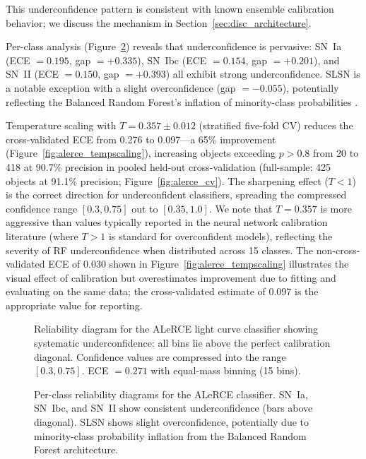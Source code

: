 \documentclass[twocolumn]{aastex631}
\begin{document}
This underconfidence pattern is consistent with known ensemble
calibration behavior; we discuss the mechanism in
Section~\ref{sec:disc_architecture}.

Per-class analysis (Figure~\ref{fig:alerce_perclass}) reveals that underconfidence is pervasive: SN~Ia (ECE $= 0.195$, gap $= +0.335$), SN~Ibc (ECE $= 0.154$, gap $= +0.201$), and SN~II (ECE $= 0.150$, gap $= +0.393$) all exhibit strong underconfidence. SLSN is a notable exception with a slight overconfidence (gap $= -0.055$), potentially reflecting the Balanced Random Forest's inflation of minority-class probabilities \citep{vandengoorbergh2022}.

Temperature scaling with $T = 0.357 \pm 0.012$ (stratified five-fold CV) reduces the cross-validated ECE from 0.276 to 0.097---a 65\% improvement (Figure~\ref{fig:alerce_tempscaling}),
increasing objects exceeding $p > 0.8$ from 20 to 418 at 90.7\% precision in pooled held-out cross-validation (full-sample: 425 objects at 91.1\% precision; Figure~\ref{fig:alerce_cv}).
The sharpening effect ($T < 1$) is the correct direction for underconfident classifiers, spreading the compressed confidence range $[0.3, 0.75]$ out to $[0.35, 1.0]$. We note that $T = 0.357$ is more aggressive than values typically reported in the neural network calibration literature (where $T > 1$ is standard for overconfident models), reflecting the severity of RF underconfidence when distributed across 15 classes. The non-cross-validated ECE of 0.030 shown in Figure~\ref{fig:alerce_tempscaling} illustrates the visual effect of calibration but overestimates improvement due to fitting and evaluating on the same data; the cross-validated estimate of 0.097 is the appropriate value for reporting.

\begin{figure}
\caption{Reliability diagram for the ALeRCE light curve classifier showing systematic underconfidence: all bins lie above the perfect calibration diagonal. Confidence values are compressed into the range $[0.3, 0.75]$. ECE $= 0.271$ with equal-mass binning (15 bins). \label{fig:alerce_reliability}}
\end{figure}

\begin{figure}
\caption{Per-class reliability diagrams for the ALeRCE classifier. SN~Ia, SN~Ibc, and SN~II show consistent underconfidence (bars above diagonal). SLSN shows slight overconfidence, potentially due to minority-class probability inflation from the Balanced Random Forest architecture. \label{fig:alerce_perclass}}
\end{figure}
\end{document}
